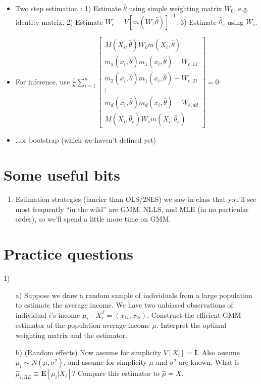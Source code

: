 \documentclass[12pt,english]{article}
\begin{document}
\begin{itemize}
\begin{itemize}
		\begin{itemize}
			\item Two step estimation : 1) Estimate $\hat{\theta}$ using simple weighting matrix $W_{0}$, e.g. identity matrix. 2) Estimate $W_{e} = V[m(W, \hat{\theta})]^{-1}$. 3) Estimate $\hat{\theta}_{e}$ using $W_{e}$.
			\item For inference, use $\frac{1}{n} \sum_{i=1}^{n} \left[ 
			\begin{array}{c} M(X_{i}, \hat{\theta}) W_{0} m(X_{i}, \hat{\theta}) \\ m_{1}(x_{i}, \hat{\theta}) m_{1}(x_{i}, \hat{\theta}) - W_{e,11} \\ m_{2}(x_{i}, \hat{\theta}) m_{1}(x_{i}, \hat{\theta}) - W_{e,21} \\ \vdots \\ m_{d}(x_{i}, \hat{\theta}) m_{d}(x_{i}, \hat{\theta}) - W_{e,dd} \\ M(X_{i}, \hat{\theta}_{e}) W_{e} m(X_{i}, \hat{\theta}_{e}) \end{array} \right] = 0$
			\item \ldots or bootstrap (which we haven't defined yet)
		\end{itemize}
	\end{itemize}
\end{itemize}

\section{Some useful bits}
\begin{enumerate}
	\item Estimation strategies (fancier than OLS/2SLS) we saw in class that you'll see most frequently ``in the wild'' are GMM, NLLS, and MLE (in no particular order), so we'll spend a little more time on GMM.
\end{enumerate}

\section{Practice questions}

1)
\begin{enumerate}
	\item[a)] Suppose we draw a random sample of individuals from a large population to estimate the average income. We have two unbiased observations of individual $i$'s income $\mu_{i}$ - $X_{i}^{T} = (x_{1i}, x_{2i})$. Construct the efficient GMM estimator of the population average income $\mu$. Interpret the optimal weighting matrix and the estimator.
	\item[b)] (Random effects) Now assume for simplicity $V[X_{i}] = \mathbf{I}$. Also assume $\mu_{i} \sim N(\mu, \sigma^{2})$, and assume for simplicity $\mu$ and $\sigma^{2}$ are known. What is $\hat{\mu}_{i,RE} \equiv \mathbf{E}[\mu_{i} | X_{i}]$? Compare this estimator to $\hat{\mu} = \overline{X}$.
\end{enumerate}
\end{document}
